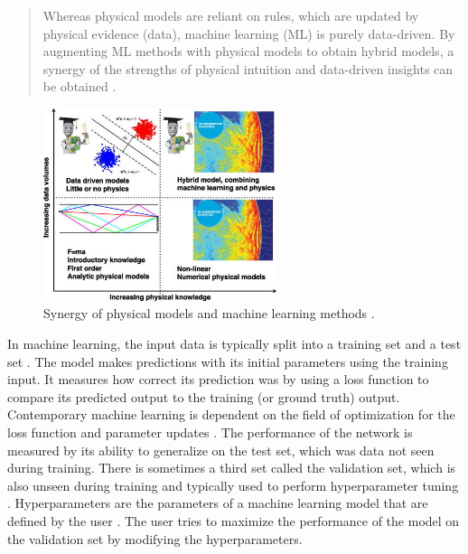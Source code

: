 \documentclass[report.tex]{subfiles}
\begin{document}
\begin{quote}
	Whereas physical models are reliant on rules, which are updated by physical evidence (data), machine learning (ML) is purely data-driven. By augmenting ML methods with physical models to obtain hybrid models, a synergy of the strengths of physical intuition and data-driven insights can be obtained \parencite[3591]{mldspmix}.
\end{quote}

\begin{figure}[ht]
	\centering
	\includegraphics[width=0.6094\textwidth]{./images-neural/dspmlmix.jpg}
	\caption{Synergy of physical models and machine learning methods \parencite[3591]{mldspmix}.}
	\label{fig:dspmlmix}
\end{figure}

In machine learning, the input data is typically split into a training set and a test set \parencite{introtoml}. The model makes predictions with its initial parameters using the training input. It measures how correct its prediction was by using a loss function to compare its predicted output to the training (or ground truth) output. Contemporary machine learning is dependent on the field of optimization \parencite{boyd2004convex, mlopt1, mlopt2} for the loss function and parameter updates \parencite{sgd}. The performance of the network is measured by its ability to generalize on the test set, which was data not seen during training. There is sometimes a third set called the validation set, which is also unseen during training and typically used to perform hyperparameter tuning \parencite{splitvaliddata}. Hyperparameters are the parameters of a machine learning model that are defined by the user \parencite{introtodl}. The user tries to maximize the performance of the model on the validation set by modifying the hyperparameters.
\end{document}
